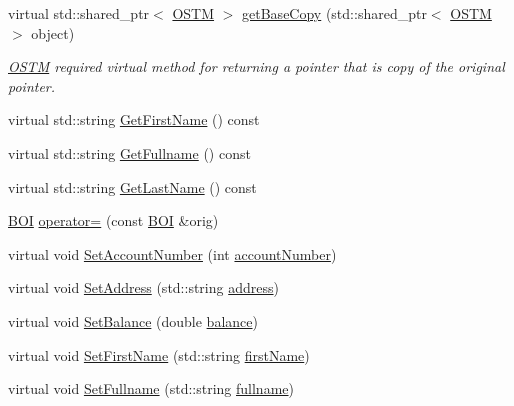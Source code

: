 \begin{DoxyCompactItemize}
\item 
virtual std\+::shared\+\_\+ptr$<$ \hyperlink{class_o_s_t_m}{O\+S\+TM} $>$ \hyperlink{class_b_o_i_ad53ae2918a656793b9d7a670d35ecfa3_ad53ae2918a656793b9d7a670d35ecfa3}{get\+Base\+Copy} (std\+::shared\+\_\+ptr$<$ \hyperlink{class_o_s_t_m}{O\+S\+TM} $>$ object)
\begin{DoxyCompactList}\small\item\em \hyperlink{class_o_s_t_m}{O\+S\+TM} required virtual method for returning a pointer that is copy of the original pointer. \end{DoxyCompactList}\item 
virtual std\+::string \hyperlink{class_b_o_i_ab4b9d50c6008a666aa4382def580e7d1_ab4b9d50c6008a666aa4382def580e7d1}{Get\+First\+Name} () const 
\item 
virtual std\+::string \hyperlink{class_b_o_i_af56446a377068cd65526e40e8b31b878_af56446a377068cd65526e40e8b31b878}{Get\+Fullname} () const 
\item 
virtual std\+::string \hyperlink{class_b_o_i_a37828f3fa4a32f522966e2cad90eaab2_a37828f3fa4a32f522966e2cad90eaab2}{Get\+Last\+Name} () const 
\item 
\hyperlink{class_b_o_i}{B\+OI} \hyperlink{class_b_o_i_a4b4a3976cc13c4d3de0d7ff8882a7af3_a4b4a3976cc13c4d3de0d7ff8882a7af3}{operator=} (const \hyperlink{class_b_o_i}{B\+OI} \&orig)
\item 
virtual void \hyperlink{class_b_o_i_affc9e7e2a36214b3790f250b7108bb65_affc9e7e2a36214b3790f250b7108bb65}{Set\+Account\+Number} (int \hyperlink{class_b_o_i_a35c9fd6e938eb44ad4e076bc6a736851_a35c9fd6e938eb44ad4e076bc6a736851}{account\+Number})
\item 
virtual void \hyperlink{class_b_o_i_a00c9386c862cf2442968bf7fc30102b3_a00c9386c862cf2442968bf7fc30102b3}{Set\+Address} (std\+::string \hyperlink{class_b_o_i_ab9315fe76fd9f07551f5ae7899d33516_ab9315fe76fd9f07551f5ae7899d33516}{address})
\item 
virtual void \hyperlink{class_b_o_i_a416667693c10f5e4120eec97a9269348_a416667693c10f5e4120eec97a9269348}{Set\+Balance} (double \hyperlink{class_b_o_i_aa00a3d8baf3420647c40119b7fa4ed6f_aa00a3d8baf3420647c40119b7fa4ed6f}{balance})
\item 
virtual void \hyperlink{class_b_o_i_ae9042f87be085c2cec799981c30d7d19_ae9042f87be085c2cec799981c30d7d19}{Set\+First\+Name} (std\+::string \hyperlink{class_b_o_i_a12872fd8c15dbf833f78862b00579ed1_a12872fd8c15dbf833f78862b00579ed1}{first\+Name})
\item 
virtual void \hyperlink{class_b_o_i_a93091f16610f1a1474aea31fd5f81ffd_a93091f16610f1a1474aea31fd5f81ffd}{Set\+Fullname} (std\+::string \hyperlink{class_b_o_i_a6d7c892a54bb6f7327cdc777081ab5f4_a6d7c892a54bb6f7327cdc777081ab5f4}{fullname})

\end{DoxyCompactItemize}
